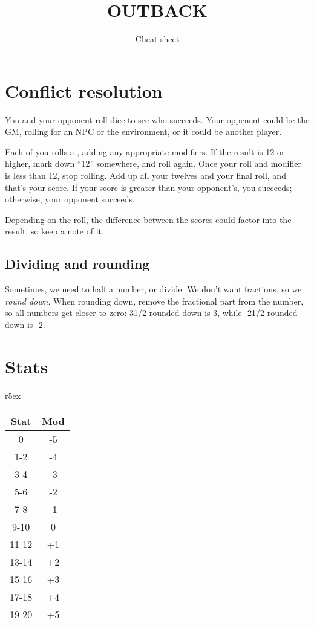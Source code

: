 \documentclass[10pt, a4paper, twocolumn]{article}
\title{\uppercase{Outback}}
\subtitle{Cheat sheet}
\date{}
\begin{document}
\maketitle

\section{Conflict resolution}
You and your opponent roll dice to see who succeeds. Your oppenent could be the
GM, rolling for an NPC or the environment, or it could be another player.

Each of you rolls a , adding any appropriate modifiers. If the result
is 12 or higher, mark down ``12'' somewhere, and roll again. Once your roll and
modifier is less than 12, stop rolling. Add up all your twelves and your final
roll, and that's your score. If your score is greater than your opponent's, you
succeeds; otherwise, your opponent succeeds.

Depending on the roll, the difference between the scores could factor into the
result, so keep a note of it. 

\subsection{Dividing and rounding}
Sometimes, we need to half a number, or divide. We don't want fractions, so we
\emph{round down}. When rounding down, remove the fractional part from the
number, so all numbers get closer to zero: 3{1/2} rounded down is 3, while -2{1/2}
rounded down is -2.

\section{Stats}

\begin{wraptable}[11]{r}{5ex}
  \small
\vspace*{-3ex}
\hspace*{-5.5ex}
\begin{tabular}{cc}
  Stat  & Mod \\
  \hline 
  0     & -5       \\
  1-2   & -4       \\
  3-4   & -3       \\
  5-6   & -2       \\
  7-8   & -1       \\
  9-10  &  0       \\
  11-12 & +1       \\
  13-14 & +2       \\
  15-16 & +3       \\
  17-18 & +4       \\
  19-20 & +5
\end{tabular}
\end{wraptable}
\end{document}
